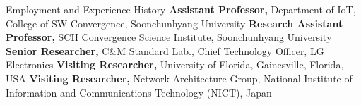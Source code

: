 \begin{rubric}{Employment and Experience History}
\entry*[2021. 3. -- Current]%
	\textbf{Assistant Professor,} \newline Department of IoT, College of SW Convergence, Soonchunhyang University
\entry*[2020. 9. -- 2021. 2.]%
	\textbf{Research Assistant Professor,} \newline SCH Convergence Science Institute, Soonchunhyang University
\entry*[2017. 2. -- 2020. 9.]%
	\textbf{Senior Researcher,} \newline C\&M Standard Lab., Chief Technology Officer, LG Electronics
\entry*[2014. 12. -- 2015. 2.]%
	\textbf{Visiting Researcher,} \newline University of Florida, Gainesville, Florida, USA
\entry*[2012. 1. -- 2012. 2.]%
	\textbf{Visiting Researcher,} \newline Network Architecture Group, National Institute of Information and Communications Technology (NICT), Japan
%
\end{rubric}